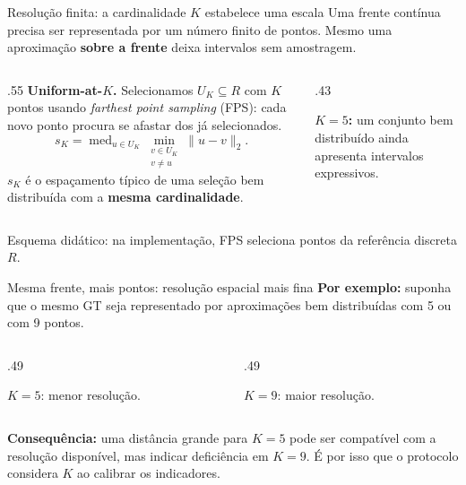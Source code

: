 \begin{frame}{Resolução finita: a cardinalidade $K$ estabelece uma escala}
Uma frente contínua precisa ser representada por um número finito de pontos. Mesmo uma aproximação \textbf{sobre a frente} deixa intervalos sem amostragem.
\begin{columns}[T,onlytextwidth]
\begin{column}{.55\textwidth}
\textbf{Uniform-at-$K$.} Selecionamos $U_K\subseteq R$ com $K$ pontos usando \emph{farthest point sampling} (FPS): cada novo ponto procura se afastar dos já selecionados.
\[
 s_K=\operatorname{med}_{u\in U_K}
 \min_{\substack{v\in U_K\\v\neq u}}\|u-v\|_2 .
\]
$s_K$ é o espaçamento típico de uma seleção bem distribuída com a \textbf{mesma cardinalidade}.
\end{column}
\begin{column}{.43\textwidth}\centering
{}
\textbf{$K=5$:} um conjunto bem distribuído ainda apresenta intervalos expressivos.
\end{column}
\end{columns}
\vspace{.12cm}
{\scriptsize Esquema didático: na implementação, FPS seleciona pontos da referência discreta $R$.}
\end{frame}

\begin{frame}{Mesma frente, mais pontos: resolução espacial mais fina}
\textbf{Por exemplo:} suponha que o mesmo GT seja representado por aproximações bem distribuídas com 5 ou com 9 pontos.
\begin{columns}[T,onlytextwidth]
\begin{column}{.49\textwidth}\centering
{}
\textbf{$K=5$}: menor resolução.
\end{column}
\begin{column}{.49\textwidth}\centering
{}
\textbf{$K=9$}: maior resolução.
\end{column}
\end{columns}
\vspace{.22cm}
\textbf{Consequência:} uma distância grande para $K=5$ pode ser compatível com a resolução disponível, mas indicar deficiência em $K=9$. É por isso que o protocolo considera $K$ ao calibrar os indicadores.
\end{frame}

